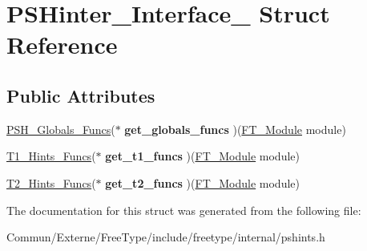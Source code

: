 \hypertarget{struct_p_s_hinter___interface__}{}\section{P\+S\+Hinter\+\_\+\+Interface\+\_\+ Struct Reference}
\label{struct_p_s_hinter___interface__}
\subsection*{Public Attributes}
\begin{DoxyCompactItemize}
\item 
\hyperlink{struct_p_s_h___globals___funcs_rec__}{P\+S\+H\+\_\+\+Globals\+\_\+\+Funcs}($\ast$ {\bfseries get\+\_\+globals\+\_\+funcs} )(\hyperlink{struct_f_t___module_rec__}{F\+T\+\_\+\+Module} module)\hypertarget{struct_p_s_hinter___interface___a76e43921277f51cb28ac5f5ca5d4d849}{}\label{struct_p_s_hinter___interface___a76e43921277f51cb28ac5f5ca5d4d849}

\item 
\hyperlink{struct_t1___hints___funcs_rec__}{T1\+\_\+\+Hints\+\_\+\+Funcs}($\ast$ {\bfseries get\+\_\+t1\+\_\+funcs} )(\hyperlink{struct_f_t___module_rec__}{F\+T\+\_\+\+Module} module)\hypertarget{struct_p_s_hinter___interface___ae46a2b9590a09e77c7fa435e5e6d7cb4}{}\label{struct_p_s_hinter___interface___ae46a2b9590a09e77c7fa435e5e6d7cb4}

\item 
\hyperlink{struct_t2___hints___funcs_rec__}{T2\+\_\+\+Hints\+\_\+\+Funcs}($\ast$ {\bfseries get\+\_\+t2\+\_\+funcs} )(\hyperlink{struct_f_t___module_rec__}{F\+T\+\_\+\+Module} module)\hypertarget{struct_p_s_hinter___interface___aff676c6c5e3ca1d266cdd2d4321b21f2}{}\label{struct_p_s_hinter___interface___aff676c6c5e3ca1d266cdd2d4321b21f2}

\end{DoxyCompactItemize}


The documentation for this struct was generated from the following file\+:\begin{DoxyCompactItemize}
\item 
Commun/\+Externe/\+Free\+Type/include/freetype/internal/pshints.\+h\end{DoxyCompactItemize}
